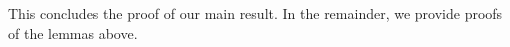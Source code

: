 This concludes the proof of  our main result.
In the remainder, we provide proofs of  the lemmas above.

%
%
%

